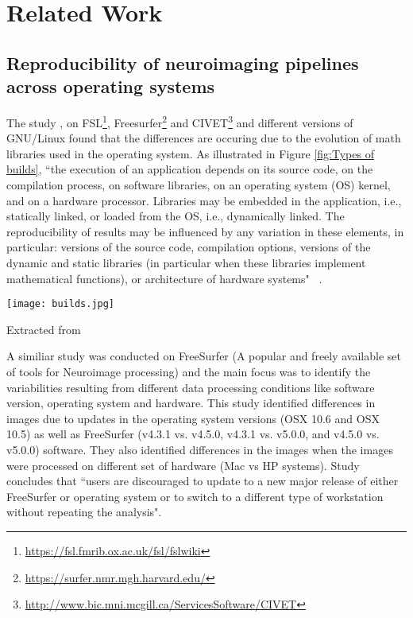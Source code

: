 \chapter{Related Work}

\section{Reproducibility of neuroimaging pipelines across operating systems}

The study \cite{Gla15}, on FSL\footnote{\url{https://fsl.fmrib.ox.ac.uk/fsl/fslwiki}}, Freesurfer\footnote{\url{https://surfer.nmr.mgh.harvard.edu/}} and CIVET\footnote{\url{http://www.bic.mni.mcgill.ca/ServicesSoftware/CIVET}} and different versions of GNU/Linux found that the differences are occuring due to the evolution of math libraries used in the operating system. As illustrated in Figure \ref{fig:Types of builds}, ``the execution of an application depends on its source code, on the compilation process, on software libraries, on an operating system (OS) kernel, and on a hardware processor. Libraries may be embedded in the application, i.e., statically linked, or loaded from the OS, i.e., dynamically linked. The reproducibility of results may be influenced by any variation in these elements, in particular: versions of the source code, compilation options, versions of the dynamic and static libraries (in particular when these libraries implement mathematical functions), or architecture of hardware systems" ~\cite{Gla15}. \\  

\begin{center}
\texttt{[image: builds.jpg]}
\label{fig:Types of builds}
\caption*{Extracted from \cite{Gla15}}
\end{center}

A similiar study \cite{10.1371/journal.pone.0038234} was conducted on FreeSurfer (A popular and freely available set of tools for Neuroimage processing) and the main focus was to identify the variabilities resulting from different data processing conditions like software version, operating system and hardware. This study identified differences in images due to updates in the operating system versions (OSX 10.6 and OSX 10.5) as well as FreeSurfer (v4.3.1 vs. v4.5.0, v4.3.1 vs. v5.0.0, and v4.5.0 vs. v5.0.0) software. They also identified differences in the images when the images were processed on different set of hardware (Mac vs HP systems). Study concludes that ``users are discouraged to update to a new major release of either FreeSurfer or operating system or to switch to a different type of workstation without repeating the analysis".\\

